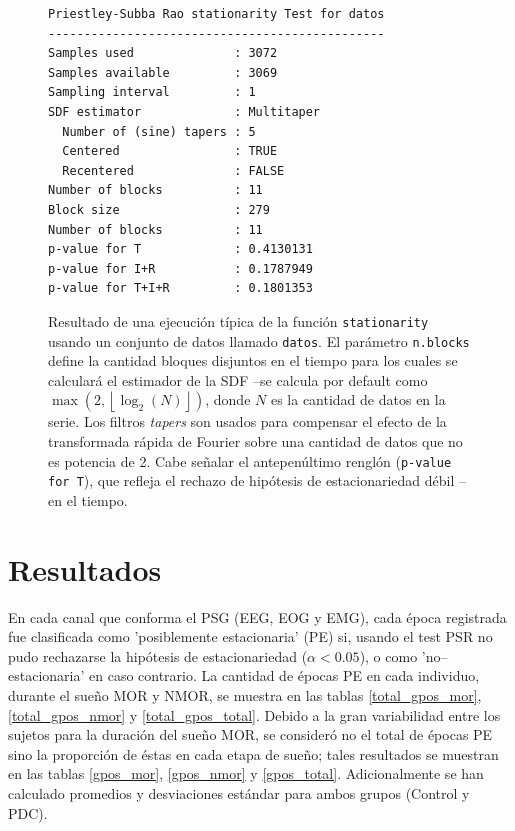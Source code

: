\documentclass[12pt,a4paper]{mitthesis}
\begin{document}
\begin{figure}
\centering
\begin{lstlisting}
Priestley-Subba Rao stationarity Test for datos
-----------------------------------------------
Samples used              : 3072 
Samples available         : 3069 
Sampling interval         : 1 
SDF estimator             : Multitaper 
  Number of (sine) tapers : 5 
  Centered                : TRUE 
  Recentered              : FALSE 
Number of blocks          : 11 
Block size                : 279 
Number of blocks          : 11 
p-value for T             : 0.4130131 
p-value for I+R           : 0.1787949 
p-value for T+I+R         : 0.1801353 
\end{lstlisting}
\caption{Resultado de una ejecuci\'on t\'ipica de la funci\'on \texttt{stationarity} usando un 
conjunto de datos llamado \texttt{datos}. 
El par\'ametro \texttt{n.blocks} define la cantidad bloques disjuntos en el tiempo para los cuales 
se calcular\'a el estimador de la SDF --se calcula por default como
$\max \left( 2 , \left\lfloor \log_2\left( N \right) \right\rfloor \right)$, donde $N$ es la 
cantidad de datos en la serie.
Los filtros \textit{tapers} son usados para compensar el efecto de la transformada r\'apida de
Fourier sobre una cantidad de datos que no es potencia de 2.
Cabe se\~nalar el antepen\'ultimo rengl\'on (\texttt{p-value for T}), que refleja el rechazo de 
hip\'otesis de estacionariedad d\'ebil --en el tiempo.}
\label{res_psr}
\end{figure}


\chapter{Resultados}

En cada canal que conforma el PSG (EEG, EOG y EMG), cada \'epoca registrada fue clasificada como 
'posiblemente estacionaria' (PE) si, usando el test PSR no pudo rechazarse la hip\'otesis de 
estacionariedad ($\alpha < 0.05$), o como 'no--estacionaria' en caso contrario.
La cantidad de \'epocas PE en cada individuo, durante el sue\~no MOR y NMOR, se muestra en las 
tablas \ref{total_gpos_mor}, \ref{total_gpos_nmor} y \ref{total_gpos_total}. Debido a la gran 
variabilidad entre los sujetos para la duraci\'on del sue\~no MOR, se consider\'o no el total de 
\'epocas PE sino la proporci\'on de \'estas en cada etapa de sue\~no; tales resultados se muestran 
en las tablas \ref{gpos_mor}, \ref{gpos_nmor} y \ref{gpos_total}. 
Adicionalmente se han calculado promedios y desviaciones est\'andar para ambos grupos (Control y 
PDC).
\end{document}
